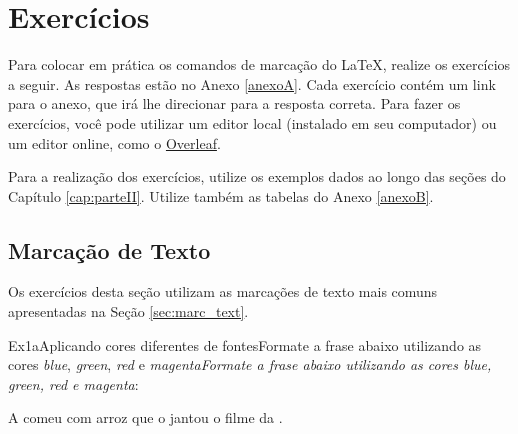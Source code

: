 \section{Exercícios}
\label{sec:exercicios}

Para colocar em prática os comandos de marcação do \LaTeX{}, realize os exercícios a seguir. As respostas estão no Anexo \ref{anexoA}. Cada exercício contém um link para o anexo, que irá lhe direcionar para a resposta correta. Para fazer os exercícios, você pode utilizar um editor local (instalado em seu computador) ou um editor online, como o \href{https://pt.overleaf.com/project}{Overleaf}.

Para a realização dos exercícios, utilize os exemplos dados ao longo das seções do Capítulo \ref{cap:parteII}. Utilize também as tabelas do Anexo \ref{anexoB}.

\tcbstartrecording

\subsection*{Marcação de Texto}
\label{sec:exec_mar_text}

Os exercícios desta seção utilizam as marcações de texto mais comuns apresentadas na Seção \ref{sec:marc_text}.


\begin{texercise}{Ex1a}{Aplicando cores diferentes de fontes}{Formate a frase abaixo utilizando as cores \textit{blue}, \textit{green}, \textit{red} e \textit{magenta}}\textit{Formate a frase abaixo utilizando as cores \textit{blue}, \textit{green}, \textit{red} e \textit{magenta}}:\par\smallskip%
\begin{tcboutputlisting}
\begin{center}
    A \color{blue}{famosa} \color{green}{Kelly} comeu 
    \color{red}{pão infetado} com arroz que o \color{magenta}{Barriga}
    jantou \color{blue}{vendo} o filme da \color{green}{Wehrmacht}
    \color{red}{xexelenta}.
\end{center}
\end{tcboutputlisting}
\tcbuselistingtext%
\end{texercise}

